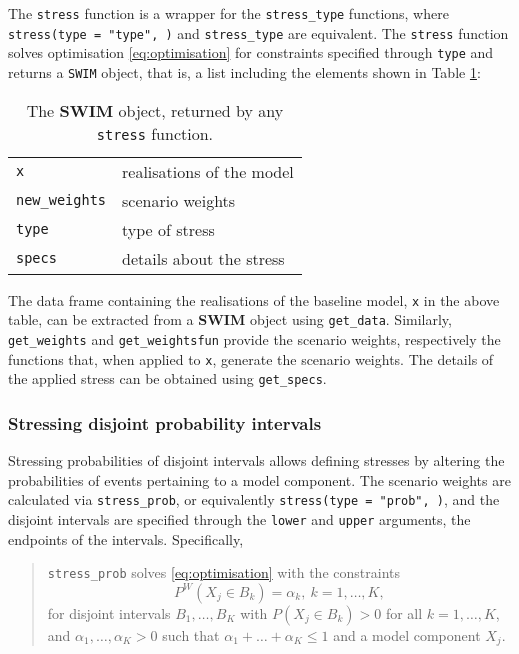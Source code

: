\documentclass[
]{article}
\begin{document}
The \texttt{stress} function is a wrapper for the \texttt{stress\_type} functions, where \texttt{stress(type\ =\ "type",\ )} and \texttt{stress\_type} are equivalent. The \texttt{stress} function solves optimisation \eqref{eq:optimisation} for constraints specified through \texttt{type} and returns a \texttt{SWIM} object, that is, a list including the elements shown in Table \ref{tab:SWIMobject}:

\begin{longtable}[]{@{}ll@{}}
\caption{\label{tab:SWIMobject} The \textbf{SWIM} object, returned by any \texttt{stress} function.}\tabularnewline
\toprule
\endhead
\texttt{x} & realisations of the model\tabularnewline
\texttt{new\_weights} & scenario weights\tabularnewline
\texttt{type} & type of stress\tabularnewline
\texttt{specs} & details about the stress\tabularnewline
\bottomrule
\end{longtable}

The data frame containing the realisations of the baseline model, \texttt{x} in the above table, can be extracted from a \textbf{SWIM} object using \texttt{get\_data}. Similarly, \texttt{get\_weights} and \texttt{get\_weightsfun} provide the scenario weights, respectively the functions that, when applied to \texttt{x}, generate the scenario weights. The details of the applied stress can be obtained using \texttt{get\_specs}.

\hypertarget{stressing-disjoint-probability-intervals}{%
\subsubsection{Stressing disjoint probability intervals}\label{stressing-disjoint-probability-intervals}}

Stressing probabilities of disjoint intervals allows defining stresses by altering the probabilities of events pertaining to a model component. The scenario weights are calculated via \texttt{stress\_prob}, or equivalently \texttt{stress(type\ =\ "prob",\ )}, and the disjoint intervals are specified through the \texttt{lower} and \texttt{upper} arguments, the endpoints of the intervals. Specifically,

\begin{quote}
\texttt{stress\_prob} solves \eqref{eq:optimisation} with the constraints
\begin{equation} 
P^W(X_j \in B_k) = \alpha_k, ~k = 1, \ldots, K, \label{eq:optimisationprob}
\end{equation}
for disjoint intervals \(B_1, \ldots, B_K\) with \(P(X_j \in B_k) >0\) for all \(k = 1, \ldots, K\), and \(\alpha_1, \ldots, \alpha_K > 0\) such that \(\alpha_1 + \ldots + \alpha_K \leq 1\) and a model component \(X_j\).
\end{quote}
\end{document}
